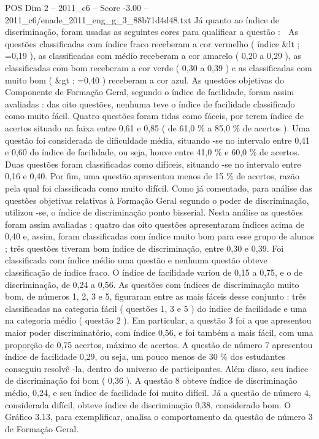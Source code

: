 \begin{textsample}{POS Dim 2 – 2011\_c6 – Score -3.00 – 2011\_c6/enade\_2011\_eng\_g\_3\_88b71d4d48.txt}
Já quanto ao índice de discriminação, foram usadas as seguintes cores para qualificar a questão :  As questões classificadas com índice fraco receberam a cor vermelho ( índice \&lt ; =0,19 ), as classificadas com médio receberam a cor amarelo ( 0,20 a 0,29 ), as classificadas com bom receberam a cor verde ( 0,30 a 0,39 ) e as classificadas com muito bom ( \&gt ; =0,40 ) receberam a cor azul.
As questões objetivas do Componente de Formação Geral, segundo o índice de facilidade, foram assim avaliadas : das oito questões, nenhuma teve o índice de facilidade classificado como muito fácil.
Quatro questões foram tidas como fáceis, por terem índice de acertos situado na faixa entre 0,61 e 0,85 ( de 61,0 \% a 85,0 \% de acertos ).
Uma questão foi considerada de dificuldade média, situando -se no intervalo entre 0,41 e 0,60 do índice de facilidade, ou seja, houve entre 41,0 \% e 60,0 \% de acertos.
Duas questões foram classificadas como difíceis, situando -se no intervalo entre 0,16 e 0,40.
Por fim, uma questão apresentou menos de 15 \% de acertos, razão pela qual foi classificada como muito difícil.
Como já comentado, para análise das questões objetivas relativas à Formação Geral segundo o poder de discriminação, utilizou -se, o índice de discriminação ponto bisserial.
Nesta análise as questões foram assim avaliadas : quatro das oito questões apresentaram índices acima de 0,40 e, assim, foram classificadas com índice muito bom para esse grupo de alunos ; três questões tiveram bom índice de discriminação, entre 0,30 e 0,39.
Foi classificada com índice médio uma questão e nenhuma questão obteve classificação de índice fraco.
O índice de facilidade variou de 0,15 a 0,75, e o de discriminação, de 0,24 a 0,56.
As questões com índices de discriminação muito bom, de números 1, 2, 3 e 5, figuraram entre as mais fáceis desse conjunto : três classificadas na categoria fácil ( questões 1, 3 e 5 ) do índice de facilidade e uma na categoria médio ( questão 2 ).
Em particular, a questão 3 foi a que apresentou maior poder discriminatório, com índice 0,56, e foi também a mais fácil, com uma proporção de 0,75 acertos, máximo de acertos.
A questão de número 7 apresentou índice de facilidade 0,29, ou seja, um pouco menos de 30 \% dos estudantes conseguiu resolvê -la, dentro do universo de participantes.
Além disso, seu índice de discriminação foi bom ( 0,36 ).
A questão 8 obteve índice de discriminação médio, 0,24, e seu índice de facilidade foi muito difícil.
Já a questão de número 4, considerada difícil, obteve índice de discriminação 0,38, considerado bom.
O Gráfico 3.13, para exemplificar, analisa o comportamento da questão de número 3 de Formação Geral.

\end{textsample}
